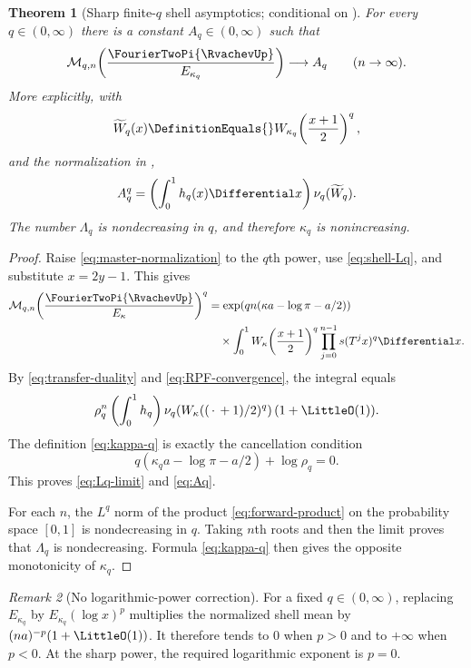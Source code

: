 \documentclass[11pt,oneside]{article}
\numberwithin{equation}{section}
\newtheorem{theorem}{Theorem}[section]
\theoremstyle{definition}
\theoremstyle{remark}
\newtheorem{remark}[theorem]{Remark}
\begin{document}
\begin{theorem}[Sharp finite-$q$ shell asymptotics; conditional on ]
\label{thm:Lq-spectrum}
For every $q\in(0,\infty)$ there is a constant $A_q\in(0,\infty)$ such that
\begin{equation}
 \mathcal M_{q,n}\!\left(\frac{\FourierTwoPi{\RvachevUp}}{E_{\kappa_q}}\right)
 \longrightarrow A_q
 \qquad(n\to\infty).
 \label{eq:Lq-limit}
\end{equation}
More explicitly, with
\[
 \widetilde W_{q}(x)
 \DefinitionEquals{}W_{\kappa_q}\!\left(\frac{x+1}{2}\right)^q,
\]
and the normalization in ,
\begin{equation}
 A_q^q=\left(\int_0^1h_q(x)\Differential x\right)\nu_q(\widetilde W_q).
 \label{eq:Aq}
\end{equation}
The number $\Lambda_q$ is nondecreasing in $q$, and therefore $\kappa_q$ is nonincreasing.
\end{theorem}

\begin{proof}
Raise \eqref{eq:master-normalization} to the $q$th power, use
\eqref{eq:shell-Lq}, and substitute $x=2y-1$.  This gives
\begin{align*}
 \mathcal M_{q,n}\!\left(\frac{\FourierTwoPi{\RvachevUp}}{E_\kappa}\right)^q
 &=\exp\!\left(qn(\kappa a-\log\pi-a/2)\right)\\
 &\quad\times\int_0^1
 W_\kappa\!\left(\frac{x+1}{2}\right)^q
 \prod_{j=0}^{n-1}s(T^jx)^q\Differential x.
\end{align*}
By \eqref{eq:transfer-duality} and \eqref{eq:RPF-convergence}, the integral equals
\[
 \rho_q^n\left(\int_0^1h_q\right)
 \nu_q\!\left(W_\kappa((\,\cdot\,+1)/2)^q\right)(1+\LittleO(1)).
\]
The definition \eqref{eq:kappa-q} is exactly the cancellation condition
\[
 q(\kappa_q a-\log\pi-a/2)+\log\rho_q=0.
\]
This proves \eqref{eq:Lq-limit} and \eqref{eq:Aq}.

For each $n$, the $L^q$ norm of the product \eqref{eq:forward-product} on the probability
space $[0,1]$ is nondecreasing in $q$.  Taking $n$th roots and then the limit proves that
$\Lambda_q$ is nondecreasing.  Formula \eqref{eq:kappa-q} then gives the opposite
monotonicity of $\kappa_q$.
\end{proof}

\begin{remark}[No logarithmic-power correction]
\label{rem:no-log-correction}
For a fixed $q\in(0,\infty)$, replacing $E_{\kappa_q}$ by
$E_{\kappa_q}(\log x)^p$ multiplies the normalized shell mean by
$(na)^{-p}(1+\LittleO(1))$.  It therefore tends to $0$ when $p>0$ and to $+\infty$ when $p<0$.
At the sharp power, the required logarithmic exponent is $p=0$.
\end{remark}
\end{document}
